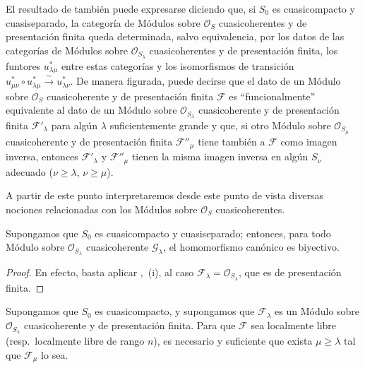 \begin{env}[8.5.3]
\label{IV.8.5.3-fr}
El resultado de  también puede expresarse diciendo que, si $S_0$ es cuasicompacto y cuasiseparado, la categoría de Módulos sobre $\mathcal O_S$ cuasicoherentes y de presentación finita queda determinada, salvo equivalencia, por los datos de las categorías de Módulos sobre $\mathcal O_{S_\lambda}$ cuasicoherentes y de presentación finita, los funtores $u_{\lambda\mu}^*$ entre estas categorías y los isomorfismos de transición $u_{\mu\nu}^*\circ u_{\lambda\mu}^*\xrightarrow{\sim}u_{\lambda\nu}^*$.
De manera figurada, puede decirse que el dato de un Módulo sobre $\mathcal O_S$ cuasicoherente y de presentación finita $\mathcal F$ es ``funcionalmente'' equivalente al dato de un Módulo sobre $\mathcal O_{S_\lambda}$ cuasicoherente y de presentación finita $\mathcal F'_\lambda$ para algún $\lambda$ suficientemente grande y que, si otro Módulo sobre $\mathcal O_{S_\mu}$ cuasicoherente y de presentación finita $\mathcal F''_\mu$ tiene también a $\mathcal F$ como imagen inversa, entonces $\mathcal F'_\lambda$ y $\mathcal F''_\mu$ tienen la misma imagen inversa en algún $S_\nu$ adecuado ($\nu\geq\lambda$, $\nu\geq\mu$).

A partir de este punto interpretaremos desde este punto de vista diversas nociones relacionadas con los Módulos sobre $\mathcal O_S$ cuasicoherentes.
\end{env}

\begin{corollary}[8.5.4]
\label{IV.8.5.4-fr}
Supongamos que $S_0$ es cuasicompacto y cuasiseparado; entonces, para todo Módulo sobre $\mathcal O_{S_\lambda}$ cuasicoherente $\mathcal G_\lambda$, el homomorfismo canónico  es biyectivo.
\end{corollary}

\begin{proof}
En efecto, basta aplicar ,~(i), al caso $\mathcal F_\lambda=\mathcal O_{S_\lambda}$, que es de presentación finita.
\end{proof}

\begin{proposition}[8.5.5]
\label{IV.8.5.5-fr}
Supongamos que $S_0$ es cuasicompacto, y supongamos que $\mathcal F_\lambda$ es un Módulo sobre $\mathcal O_{S_\lambda}$ cuasicoherente y de presentación finita.
Para que $\mathcal F$ sea localmente libre (\textup{resp.}\ localmente libre de rango $n$), es necesario y suficiente que exista $\mu\geq\lambda$ tal que $\mathcal F_\mu$ lo sea.
\end{proposition}

